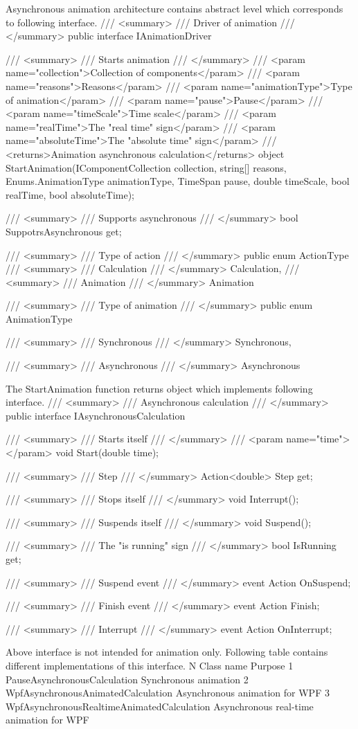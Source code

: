 \documentclass[10pt,journal,compsoc]{IEEEtran}
\begin{document}
Asynchronous animation architecture contains abstract level which corresponds to following interface.
/// <summary>
/// Driver of animation
/// </summary>
public interface IAnimationDriver
{
	/// <summary>
	/// Starts animation
	/// </summary>
	/// <param name="collection">Collection of components</param>
	/// <param name="reasons">Reasons</param>
	/// <param name="animationType">Type of animation</param>
	/// <param name="pause">Pause</param>
	/// <param name="timeScale">Time scale</param>
	/// <param name="realTime">The "real time" sign</param>
	/// <param name="absoluteTime">The "absolute time" sign</param>
	/// <returns>Animation asynchronous calculation</returns>
	object StartAnimation(IComponentCollection collection, string[] reasons,
	Enums.AnimationType animationType,
	TimeSpan pause, double timeScale, bool realTime, bool absoluteTime);
	
	/// <summary>
	/// Supports asynchronous
	/// </summary>
	bool SuppotrsAsynchronous
	{
		get;
	}
}

/// <summary>
/// Type of action
/// </summary>
public enum ActionType
{
	/// <summary>
	/// Calculation
	/// </summary>
	Calculation,
	/// <summary>
	/// Animation
	/// </summary>
	Animation
}


/// <summary>
/// Type of animation
/// </summary>
public enum AnimationType
{
	/// <summary>
	/// Synchronous
	/// </summary>
	Synchronous,
	
	/// <summary>
	/// Asynchronous
	/// </summary>
	Asynchronous
}
The StartAnimation function returns object which implements following interface.
/// <summary>
/// Asynchronous calculation
/// </summary>
public interface IAsynchronousCalculation
{
	/// <summary>
	/// Starts itself
	/// </summary>
	/// <param name="time"></param>
	void Start(double time);
	
	/// <summary>
	/// Step
	/// </summary>
	Action<double> Step
	{
		get;
	}
	
	/// <summary>
	/// Stops itself
	/// </summary>
	void Interrupt();
	
	/// <summary>
	/// Suspends itself
	/// </summary>
	void Suspend();
	
	/// <summary>
	/// The "is running" sign
	/// </summary>
	bool IsRunning
	{
		get;
	}
	
	/// <summary>
	/// Suspend event
	/// </summary>
	event Action OnSuspend;
	
	/// <summary>
	/// Finish event
	/// </summary>
	event Action Finish;
	
	/// <summary>
	/// Interrupt
	/// </summary>
	event Action OnInterrupt;
	
}
Above interface is not intended for animation only. Following table contains different implementations of this interface.
N  Class name  Purpose 
1  PauseAsynchronousCalculation  Synchronous animation 
2  WpfAsynchronousAnimatedCalculation  Asynchronous animation for WPF 
3  WpfAsynchronousRealtimeAnimatedCalculation  Asynchronous real-time animation for WPF 
\end{document}
